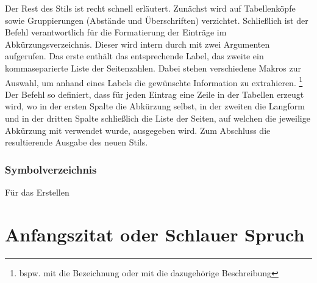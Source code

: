 \documentclass[english,ngerman]{tudscrartcl}
\begin{document}
Der Rest des Stils ist recht schnell erläutert. Zunächst wird auf Tabellenköpfe 
sowie Gruppierungen (Abstände und Überschriften) verzichtet. Schließlich ist 
der Befehl  verantwortlich für die Formatierung der Einträge 
im Abkürzungsverzeichnis. Dieser wird intern durch  mit 
zwei Argumenten aufgerufen. Das erste enthält das entsprechende Label, das 
zweite ein kommaseparierte Liste der Seitenzahlen. Dabei stehen verschiedene 
Makros zur Auswahl, um anhand eines Labels die gewünschte Information zu 
extrahieren.%
\footnote{%
  bspw. mit  die Bezeichnung oder mit 
   die dazugehörige Beschreibung%
}
Der Befehl  so definiert, dass für jeden Eintrag eine Zeile 
in der Tabellen erzeugt wird, wo in der ersten Spalte die Abkürzung selbst, in 
der zweiten die Langform und in der dritten Spalte schließlich die Liste der 
Seiten, auf welchen die jeweilige Abkürzung mit  
verwendet wurde, ausgegeben wird. Zum Abschluss die resultierende Ausgabe des 
neuen Stils.
%
\begin{Tutorial*}
\printacronyms[style=acronymstabu]
\end{Tutorial*}
\vspace*{-1.5\baselineskip}\par\noindent%
\begin{quoting}[rightmargin=0pt]
\printacronyms[style=acronymstabu]
\end{quoting}

\subsubsection{Symbolverzeichnis}
Für das Erstellen 





\section{Anfangszitat oder Schlauer Spruch}
\end{document}
